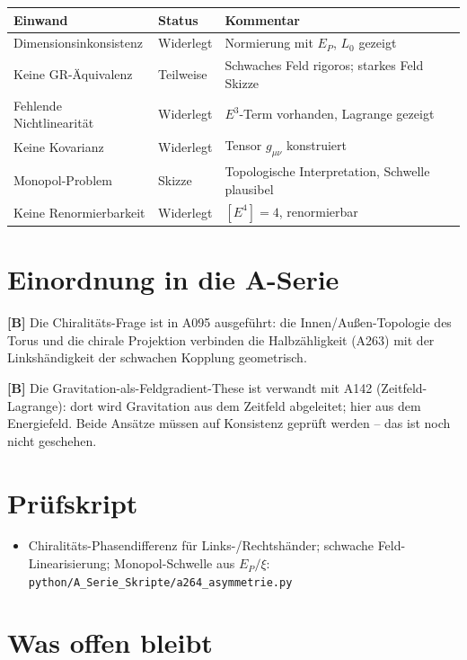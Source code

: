 \begin{center}
\renewcommand{\arraystretch}{1.3}
{\small\setlength\tabcolsep{4pt}
\begin{tabular}{p{5.5cm}lp{5cm}}
\toprule
Einwand & Status & Kommentar \\
\midrule
Dimensionsinkonsistenz & Widerlegt & Normierung mit $E_P$, $L_0$ gezeigt \\
Keine GR-Äquivalenz & Teilweise & Schwaches Feld rigoros; starkes Feld Skizze \\
Fehlende Nichtlinearität & Widerlegt & $E^3$-Term vorhanden, Lagrange gezeigt \\
Keine Kovarianz & Widerlegt & Tensor $g_{\mu\nu}$ konstruiert \\
Monopol-Problem & Skizze & Topologische Interpretation, Schwelle plausibel \\
Keine Renormierbarkeit & Widerlegt & $[E^4]=4$, renormierbar \\
\bottomrule
\end{tabular}
}
\renewcommand{\arraystretch}{1.0}
\end{center}

\section{Einordnung in die A-Serie}

\textbf{[B]} Die Chiralitäts-Frage ist in A095 ausgeführt: die Innen/Außen-Topologie
des Torus und die chirale Projektion verbinden die Halbzähligkeit (A263) mit der
Linkshändigkeit der schwachen Kopplung geometrisch.

\textbf{[B]} Die Gravitation-als-Feldgradient-These ist verwandt mit A142 (Zeitfeld-Lagrange):
dort wird Gravitation aus dem Zeitfeld abgeleitet; hier aus dem Energiefeld. Beide
Ansätze müssen auf Konsistenz geprüft werden -- das ist noch nicht geschehen.

\section{Prüfskript}

\begin{itemize}[leftmargin=2em,itemsep=2pt,topsep=2pt]
  \item Chiralitäts-Phasendifferenz für Links-/Rechtshänder; schwache Feld-Linearisierung;
    Monopol-Schwelle aus $E_P/\xi$:
    \texttt{python/A\_Serie\_Skripte/a264\_asymmetrie.py}
\end{itemize}

\section{Was offen bleibt}

